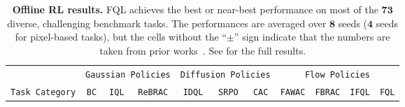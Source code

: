 \begin{table*}[t!]
\vspace{-10pt}
\caption{
\footnotesize
\textbf{Offline RL results.}
FQL achieves the best or near-best performance on most of the $\mathbf{73}$ diverse, challenging benchmark tasks.
%
%
The performances are averaged over $\mathbf{8}$ seeds ($\mathbf{4}$ seeds for pixel-based tasks),
but the cells without the ``$\pm$'' sign indicate that the numbers are taken
from prior works~\citep{corl_tarasov2023, idql_hansenestruch2023, srpo_chen2024}.
See  for the full results.
}
\label{table:offline}
\centering
\vspace{5pt}
\scalebox{0.76}
{
%
\begin{threeparttable}
\begin{tabular}{lcccccccccc}
\toprule
%
%
%
\multicolumn{1}{c}{} & \multicolumn{3}{c}{\texttt{Gaussian Policies}} & \multicolumn{3}{c}{\texttt{Diffusion Policies}} & \multicolumn{4}{c}{\texttt{Flow Policies}} \\
\cmidrule(lr){2-4} \cmidrule(lr){5-7} \cmidrule(lr){8-11}
\texttt{Task Category} & \texttt{BC} & \texttt{IQL} & \texttt{ReBRAC} & \texttt{IDQL} & \texttt{SRPO} & \texttt{CAC} & \texttt{FAWAC} & \texttt{FBRAC} & \texttt{IFQL} & \texttt{\color{myblue}FQL} \\
\midrule




\end{tabular}
\end{threeparttable}}
\end{table*}
